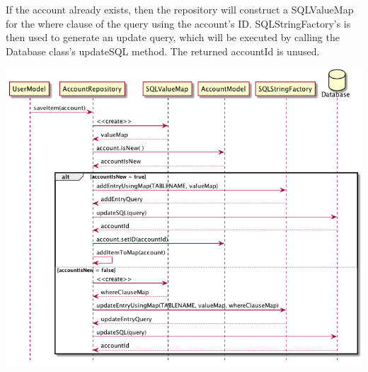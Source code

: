 \documentclass[12pt]{article}
\begin{document}
If the account already exists, then the repository will construct a SQLValueMap for the where clause of the query using the account's ID. SQLStringFactory's is then used to generate an update query, which will be executed by calling the Database class's updateSQL method. The returned accountId is unused. 

\includegraphics[width=\textwidth,height=\textheight,keepaspectratio]{diagrams/sequence/accRepoSaveItem.png}
\end{document}
